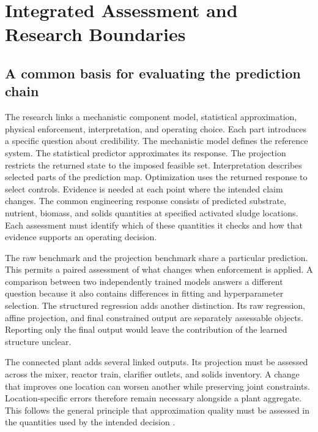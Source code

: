 \chapter{Integrated Assessment and Research Boundaries}
\label{ch:assessment}

\section{A common basis for evaluating the prediction chain}

The research links a mechanistic component model, statistical approximation, physical enforcement, interpretation, and operating choice. Each part introduces a specific question about credibility. The mechanistic model defines the reference system. The statistical predictor approximates its response. The projection restricts the returned state to the imposed feasible set. Interpretation describes selected parts of the prediction map. Optimization uses the returned response to select controls. Evidence is needed at each point where the intended claim changes. The common engineering response consists of predicted substrate, nutrient, biomass, and solids quantities at specified activated sludge locations. Each assessment must identify which of these quantities it checks and how that evidence supports an operating decision.

The raw benchmark and the projection benchmark share a particular prediction. This permits a paired assessment of what changes when enforcement is applied. A comparison between two independently trained models answers a different question because it also contains differences in fitting and hyperparameter selection. The structured regression adds another distinction. Its raw regression, affine projection, and final constrained output are separately assessable objects. Reporting only the final output would leave the contribution of the learned structure unclear.

The connected plant adds several linked outputs. Its projection must be assessed across the mixer, reactor train, clarifier outlets, and solids inventory. A change that improves one location can worsen another while preserving joint constraints. Location-specific errors therefore remain necessary alongside a plant aggregate. This follows the general principle that approximation quality must be assessed in the quantities used by the intended decision \citep{BhosekarIerapetritou2018,McBride2019}.

